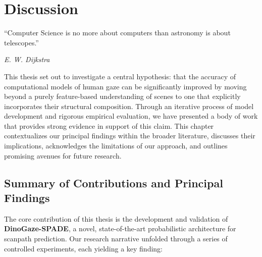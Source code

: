 \chapter{Discussion}
\label{c:conc}

\epigraph{\enquote{Computer Science is no more about computers than astronomy is about telescopes.}}{\emph{E. W. Dijkstra}}


This thesis set out to investigate a central hypothesis: that the accuracy of computational models of human gaze can be significantly improved by moving beyond a purely feature-based understanding of scenes to one that explicitly incorporates their structural composition. Through an iterative process of model development and rigorous empirical evaluation, we have presented a body of work that provides strong evidence in support of this claim. This chapter contextualizes our principal findings within the broader literature, discusses their implications, acknowledges the limitations of our approach, and outlines promising avenues for future research.

\section{Summary of Contributions and Principal Findings}
\label{sec:discussion_summary}

The core contribution of this thesis is the development and validation of \textbf{DinoGaze-SPADE}, a novel, state-of-the-art probabilistic architecture for scanpath prediction. Our research narrative unfolded through a series of controlled experiments, each yielding a key finding:

